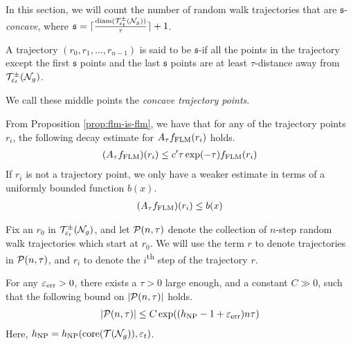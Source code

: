 In this section, we will count the number of random walk trajectories that are $\mathfrak{s}$-\emph{concave}, where $\mathfrak{s} = \lceil \frac{\mathrm{diam}(\mathcal{T}_{\varepsilon_t}^{\pm}(\mathcal{N}_g))}{\tau} \rceil + 1$.

\begin{definition}
  A trajectory $\left( r_0, r_1, \ldots, r_{n-1} \right)$ is said to be $\mathfrak{s}$-\concave if all the points in the trajectory except the first $\mathfrak{s}$ points and the last $\mathfrak{s}$ points are at least $\tau$-distance away from $\mathcal{T}_{\varepsilon_t}^{\pm}(\mathcal{N}_g)$.

  We call these middle points the \emph{concave trajectory points}.
\end{definition}
From Proposition \ref{prop:flm-is-flm}, we have that for any of the \concave trajectory points $r_i$, the following decay estimate for $A_{\tau}f_{\mathrm{FLM}}(r_i)$ holds.
\begin{align*}
  (A_{\tau} f_{\mathrm{FLM}})(r_i) \leq c^{\prime} \tau \exp(-\tau) f_{\mathrm{FLM}}(r_i)
\end{align*}
If $r_i$ is not a \concave trajectory point, we only have a weaker estimate in terms of a uniformly bounded function $b(x)$.
\begin{align*}
  (A_{\tau} f_{\mathrm{FLM}})(r_i) \leq b(x)
\end{align*}


Fix an $r_0$ in $\mathcal{T}_{\varepsilon_t}^{\pm}(\mathcal{N}_g)$, and let $\mathcal{P}(n, \tau)$ denote the collection of $n$-step \concave random walk trajectories which start at $r_0$.
We will use the term $r$ to denote trajectories in $\mathcal{P}(n, \tau)$, and $r_i$ to denote the $i$\textsuperscript{th} step of the trajectory $r$.

\begin{proposition}
  \label{prop:rw-recurrence}
  For any $\varepsilon_{\mathrm{err}} > 0$, there exists a $\tau > 0$ large enough, and a constant $C \gg 0$,  such that the following bound on $\left| \mathcal{P}(n, \tau) \right|$ holds.
  \begin{align*}
    \left| \mathcal{P}(n, \tau) \right| \leq C \exp((h_{\mathrm{NP}} - 1 + \varepsilon_{\mathrm{err}})n\tau)
  \end{align*}
  Here, $h_{\mathrm{NP}} = h_{\mathrm{NP}}(\mathrm{core}(\mathcal{T}(\mathcal{N}_g)), \varepsilon_t)$.
\end{proposition}

